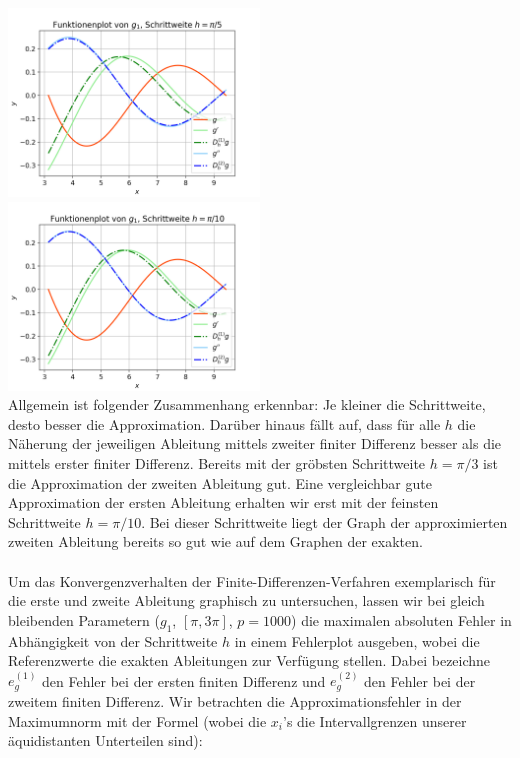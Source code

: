 \documentclass{scrartcl}
\begin{document}
\includegraphics[width=0.5\textwidth]{Grafiken/Funktionenplot_Pi_Funftel} \includegraphics[width=0.5\textwidth]{Grafiken/Funktionenplot_Pi_Zehntel}\\
\vspace{-0.5cm}
\vspace{0.5cm}
Allgemein ist folgender Zusammenhang erkennbar: Je kleiner die Schrittweite, desto besser die Approximation.
Darüber hinaus fällt auf, dass für alle $h$ die Näherung der jeweiligen Ableitung mittels zweiter finiter Differenz besser als die mittels erster finiter Differenz.
Bereits mit der gröbsten Schrittweite $h = \pi/3$ ist die Approximation der zweiten Ableitung gut.
Eine vergleichbar gute Approximation der ersten Ableitung erhalten wir erst mit der feinsten Schrittweite $h = \pi/10$.
Bei dieser Schrittweite liegt der Graph der approximierten zweiten Ableitung bereits so gut wie auf dem Graphen der exakten. \\
 \\
Um das Konvergenzverhalten der Finite-Differenzen-Verfahren exemplarisch für die erste und zweite Ableitung graphisch zu untersuchen, lassen wir bei gleich bleibenden Parametern ($g_1$, $[\pi, 3\pi]$, $p = 1000$) die maximalen absoluten Fehler in Abhängigkeit von der Schrittweite $h$ in einem Fehlerplot ausgeben, wobei die Referenzwerte die exakten Ableitungen zur Verfügung stellen. Dabei bezeichne $e_g^{(1)}$ den Fehler bei der ersten finiten Differenz und $e_g^{(2)}$ den Fehler bei der zweitem finiten Differenz. Wir betrachten die Approximationsfehler in der Maximumnorm mit der Formel (wobei die $x_i$'s die Intervallgrenzen unserer äquidistanten Unterteilen sind):
\end{document}
